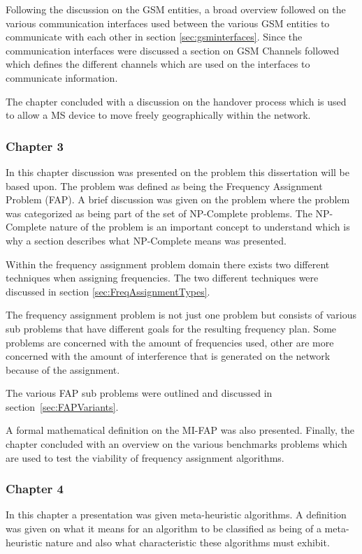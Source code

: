 Following the discussion on the GSM entities, a broad overview followed on the various communication interfaces used between the various GSM entities to communicate with each other in section \ref{sec:gsminterfaces}. Since the communication interfaces were discussed a section on GSM Channels followed which defines the different channels which are used on the interfaces to communicate information.

The chapter concluded with a discussion on the handover process which is used to allow a MS device to move freely geographically within the network. 
\subsubsection{Chapter 3}
In this chapter discussion was presented on the problem this dissertation will be based upon. The problem was defined as being the Frequency Assignment Problem (FAP). A brief discussion was given on the problem where the problem was categorized as being part of the set of NP-Complete problems. The NP-Complete nature of the problem is an important concept to understand which is why a section describes what NP-Complete means was presented.

Within the frequency assignment problem domain there exists two different techniques when assigning frequencies. The two different techniques were discussed in section \ref{sec:FreqAssignmentTypes}. 

The frequency assignment problem is not just one problem but consists of various sub problems that have different goals for the resulting frequency plan. Some problems are concerned with the amount of frequencies used, other are more concerned with the amount of interference that is generated on the network because of the assignment.

The various FAP sub problems were outlined and discussed in section~\ref{sec:FAPVariants}.

A formal mathematical definition on the MI-FAP was also presented. Finally, the chapter concluded with an overview on the various benchmarks problems which are used to test the viability of frequency assignment algorithms.
\subsubsection{Chapter 4}
In this chapter a presentation was given meta-heuristic algorithms. A definition was given on what it means for an algorithm to be classified as being of a meta-heuristic nature and also what characteristic these algorithms must exhibit.

